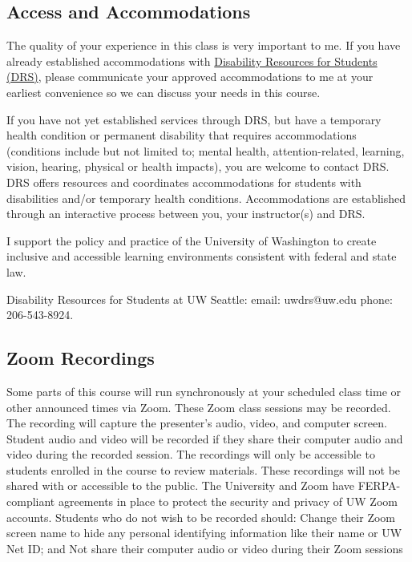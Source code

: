  
    
\subsection{ Access and Accommodations}
 
The quality of your experience in this class is very important to me. If you have already established accommodations with
\href{http://depts.washington.edu/uwdrs/}
{Disability Resources for Students (DRS)}, 
please communicate your approved accommodations to me at your earliest convenience so we can discuss your needs in this course.

If you have not yet established services through DRS, but have a temporary health condition or permanent disability that requires accommodations (conditions include but not limited to; mental health, attention-related, learning, vision, hearing, physical or health impacts), you are welcome to contact DRS. DRS offers resources and coordinates accommodations for students with disabilities and/or temporary health conditions.  Accommodations are established through an interactive process between you, your instructor(s) and DRS.  

I support the policy and practice of the University of Washington to create inclusive and accessible learning environments consistent with federal and state law. 
  
Disability Resources for Students at UW Seattle: email: uwdrs@uw.edu phone: 206-543-8924.

\subsection{Zoom Recordings}
Some parts of this course will run synchronously at your scheduled class time or other announced times via Zoom. These Zoom class sessions may be recorded. The recording will capture the presenter’s audio, video, and computer screen. Student audio and video will be recorded if they share their computer audio and video during the recorded session. The recordings will only be accessible to students enrolled in the course to review materials. These recordings will not be shared with or accessible to the public.  The University and Zoom have FERPA-compliant agreements in place to protect the security and privacy of UW Zoom accounts.
Students who do not wish to be recorded should:
Change their Zoom screen name to hide any personal identifying information like their name or UW Net ID; and
Not share their computer audio or video during their Zoom sessions


%


